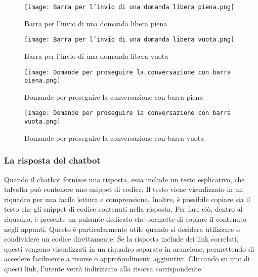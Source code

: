 \begin{figure}[h]
    \centering
        \texttt{[image: Barra per l'invio di una domanda libera piena.png]}
        \caption{Barra per l'invio di una domanda libera piena}
        \label{fig:Barra per l'invio di una domanda libera piena}        
\end{figure}
\begin{figure}[h]
    \centering
        \texttt{[image: Barra per l'invio di una domanda libera vuota.png]}
        \caption{Barra per l'invio di una domanda libera vuota}
        \label{fig:Barra per l'invio di una domanda libera vuota}        
\end{figure}
\begin{figure}[h]
    \centering
        \texttt{[image: Domande per proseguire la conversazione con barra piena.png]}
        \caption{Domande per proseguire la conversazione con barra piena}
        \label{fig:Domande per proseguire la conversazione con barra piena}        
\end{figure}
\begin{figure}[h]
    \centering
        \texttt{[image: Domande per proseguire la conversazione con barra vuota.png]}
        \caption{Domande per proseguire la conversazione con barra vuota}
        \label{fig:Domande per proseguire la conversazione con barra vuota}        
\end{figure}
 
\subsubsection{La risposta del chatbot}  
\label{subsec:la_risposta_del_chatbot}  

Quando il chatbot fornisce una risposta, essa include un testo esplicativo, che talvolta può contenere uno snippet di codice. Il testo viene visualizzato in un riquadro per una facile lettura e comprensione. 
Inoltre, è possibile copiare sia il testo che gli snippet di codice contenuti nella risposta. Per fare ciò, dentro al riquadro, è presente un pulsante dedicato che permette di copiare il contenuto negli appunti. Questo è particolarmente utile quando si desidera utilizzare o condividere un codice direttamente.
Se la risposta include dei link correlati, questi vengono visualizzati in un riquadro separato in arancione, permettendo di accedere facilmente a risorse o approfondimenti aggiuntivi. Cliccando su uno di questi link, l'utente verrà indirizzato alla risorsa corrispondente.

